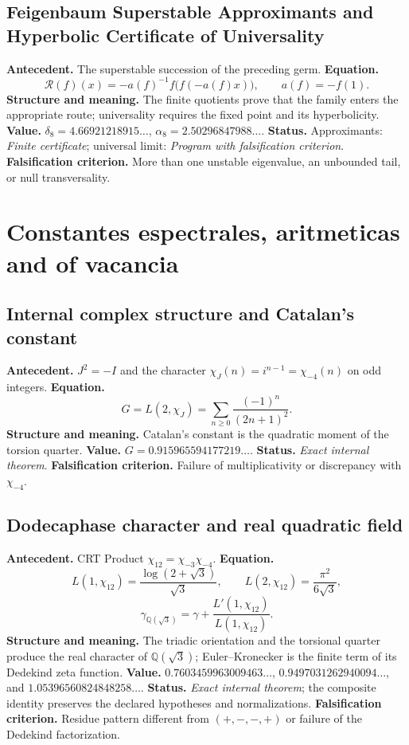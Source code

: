 \subsection*{Feigenbaum Superstable Approximants and Hyperbolic Certificate of Universality}
\textbf{Antecedent.} The superstable succession of the preceding germ.
\textbf{Equation.}
\[
\mathcal R(f)(x)=-a(f)^{-1}f\bigl(f(-a(f)x)\bigr),
\qquad a(f)=-f(1).
\]
\textbf{Structure and meaning.} The finite quotients prove that the
family enters the appropriate route; universality requires the fixed point and
its hyperbolicity. \textbf{Value.}
\(\delta_8=4.66921218915\ldots\),
\(\alpha_8=2.50296847988\ldots\). \textbf{Status.} Approximants:
\emph{Finite certificate}; universal limit: \emph{Program with
falsification criterion}. \textbf{Falsification criterion.} More than one unstable eigenvalue, an unbounded tail,
or null transversality.

\section{Constantes espectrales, aritmeticas and of vacancia}

\subsection*{Internal complex structure and Catalan's constant }
\textbf{Antecedent.} \(J^2=-I\) and the character
\(\chi_J(n)=i^{n-1}=\chi_{-4}(n)\) on odd integers. \textbf{Equation.}
\[
G=L(2,\chi_J)=\sum_{n\ge0}\frac{(-1)^n}{(2n+1)^2}.
\]
\textbf{Structure and meaning.} Catalan's constant is the quadratic moment of the torsion quarter. \textbf{Value.} \(G=0.915965594177219\ldots\). \textbf{Status.} \emph{Exact internal theorem}. \textbf{Falsification criterion.} Failure of multiplicativity or discrepancy with \(\chi_{-4}\).

\subsection*{Dodecaphase character and real quadratic field }
\textbf{Antecedent.} CRT Product
\(\chi_{12}=\chi_{-3}\chi_{-4}\). \textbf{Equation.}
\[
L(1,\chi_{12})=\frac{\log(2+\sqrt3)}{\sqrt3},
\qquad L(2,\chi_{12})=\frac{\pi^2}{6\sqrt3},
\]
\[
\gamma_{\mathbb Q(\sqrt3)}
=\gamma+\frac{L'(1,\chi_{12})}{L(1,\chi_{12})}.
\]
\textbf{Structure and meaning.} The triadic orientation and the torsional quarter produce the real character of \(\mathbb Q(\sqrt3)\);
Euler--Kronecker is
the finite term of its Dedekind zeta function. \textbf{Value.}
\(0.7603459963009463\ldots\), \(0.9497031262940094\ldots\), and
\(1.05396560824848258\ldots\). \textbf{Status.} \emph{Exact internal theorem};
the composite identity preserves the declared hypotheses and normalizations.
\textbf{Falsification criterion.} Residue pattern different from \((+,-,-,+)\) or failure of
the Dedekind factorization.

